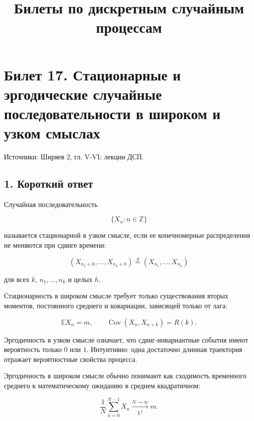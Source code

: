 \documentclass[
  11pt,
  a4paper,
]{article}
\title{Билеты по дискретным случайным процессам}
\author{}
\date{}
\begin{document}
\maketitle

\section{Билет 17. Стационарные и эргодические случайные
последовательности в широком и узком
смыслах}\label{ux431ux438ux43bux435ux442-17.-ux441ux442ux430ux446ux438ux43eux43dux430ux440ux43dux44bux435-ux438-ux44dux440ux433ux43eux434ux438ux447ux435ux441ux43aux438ux435-ux441ux43bux443ux447ux430ux439ux43dux44bux435-ux43fux43eux441ux43bux435ux434ux43eux432ux430ux442ux435ux43bux44cux43dux43eux441ux442ux438-ux432-ux448ux438ux440ux43eux43aux43eux43c-ux438-ux443ux437ux43aux43eux43c-ux441ux43cux44bux441ux43bux430ux445}

Источники: Ширяев 2, гл. V-VI; лекции ДСП.

\subsection{1. Короткий
ответ}\label{ux43aux43eux440ux43eux442ux43aux438ux439-ux43eux442ux432ux435ux442}

Случайная последовательность

\[
\{X_n:n\in\mathbb Z\}
\]

называется стационарной в узком смысле, если ее конечномерные
распределения не меняются при сдвиге времени:

\[
(X_{n_1+h},\ldots,X_{n_k+h})
\stackrel d=
(X_{n_1},\ldots,X_{n_k})
\]

для всех \(k\), \(n_1,\ldots,n_k\) и целых \(h\).

Стационарность в широком смысле требует только существования вторых
моментов, постоянного среднего и ковариации, зависящей только от лага:

\[
\mathbb E X_n=m,
\qquad
\operatorname{Cov}(X_n,X_{n+k})=R(k).
\]

Эргодичность в узком смысле означает, что сдвиг-инвариантные события
имеют вероятность только \(0\) или \(1\). Интуитивно: одна достаточно
длинная траектория отражает вероятностные свойства процесса.

Эргодичность в широком смысле обычно понимают как сходимость временного
среднего к математическому ожиданию в среднем квадратичном:

\[
\frac1N\sum_{n=0}^{N-1}X_n
\xrightarrow[L^2]{N\to\infty}
m.
\]
\end{document}
